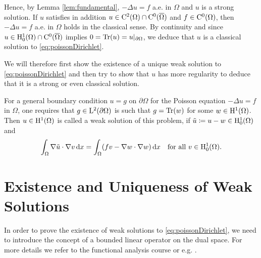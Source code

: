 Hence, by Lemma \ref{lem:fundamental}, $-\Delta u = f$ a.e. in $\Omega$ and $u$ is a strong solution. If $u$ satisfies in addition $u \in \mathrm{C}^2(\Omega) \cap \mathrm{C}^0(\overline\Omega)$ and $f \in \mathrm{C}^0(\Omega)$, then $-\Delta u = f$ a.e. in $\Omega$ holds in the classical sense. 
By continuity and since $u \in \mathrm{H}_0^1(\Omega) \cap \mathrm{C}^0(\overline\Omega)$ implies $0 = \operatorname{Tr}(u) = u|_{\partial\Omega}$, we deduce that $u$ is a classical solution to \eqref{eq:poissonDirichlet}.

We will therefore first show the existence of a unique weak solution to \eqref{eq:poissonDirichlet} and then try to show that $u$ has more regularity to deduce that it is a strong or even classical solution.

For a general boundary condition $u = g$ on $\partial\Omega$ for the Poisson equation $-\Delta u = f$ in $\Omega$, one requires that $g \in \mathrm{L}^2(\partial\Omega)$ is such that $g = \operatorname{Tr}(w)$ for some $w \in \mathrm{H}^1(\Omega)$.
Then $u \in \mathrm{H}^1(\Omega)$ is called a weak solution of this problem, if $\tilde u \coloneqq u - w \in \mathrm{H}_0^1(\Omega)$ and 
$$
\int_\Omega \nabla \tilde u \cdot \nabla v \, {\operatorname{d}\!{x}}
= \int_\Omega (f v - \nabla w \cdot \nabla w) \, {\operatorname{d}\!{x}} \quad\text{for all } v \in \mathrm{H}_0^1(\Omega).
$$

\section{Existence and Uniqueness of Weak Solutions}

In order to prove the existence of weak solutions to \eqref{eq:poissonDirichlet}, we need to introduce the concept of a bounded linear operator on the dual space.
For more details we refer to the functional analysis course or e.g. \cite[Sections 2.3, 2.4]{dobrowolski2010angewandte}.

